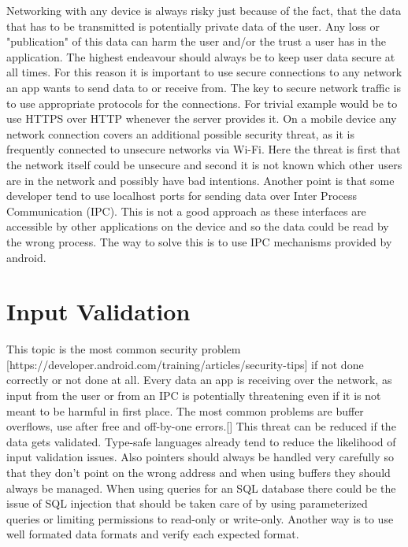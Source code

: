 Networking with any device is always risky just because of the fact, that the data that has to be transmitted is potentially private data of the user. Any loss or "publication" of this data can harm the user and/or the trust a user has in the application. The highest endeavour should always be to keep user data secure at all times. For this reason it is important to use secure connections to any network an app wants to send data to or receive from. 
The key to secure network traffic is to use appropriate protocols for the connections. For trivial example would be to use HTTPS over HTTP whenever the server provides it.
On a mobile device any network connection covers an additional possible security threat, as it is frequently connected to unsecure networks via Wi-Fi. Here the threat is first that the network itself could be unsecure and second it is not known which other users are in the network and possibly have bad intentions.
Another point is that some developer tend to use localhost ports for sending data over Inter Process Communication (IPC). This is not a good approach as these interfaces are accessible by other applications on the device and so the data could be read by the wrong process. The way to solve this is to use IPC mechanisms provided by android.

\section{Input Validation}
\label{chp:howto:sec:inputValidation}

This topic is the most common security problem [https://developer.android.com/training/articles/security-tips] if not done correctly or not done at all. Every data an app is receiving over the network, as input from the user or from an IPC is potentially threatening even if it is not meant to be harmful in first place.
The most common problems are buffer overflows, use after free and off-by-one errors.[] This threat can be reduced if the data gets validated.
Type-safe languages already tend to reduce the likelihood of input validation issues. Also pointers should always be handled very carefully so that they don't point on the wrong address and when using buffers they should always be managed.
When using queries for an SQL database there could be the issue of SQL injection that should be taken care of by using parameterized queries or limiting permissions to read-only or write-only. Another way is to use well formated data formats and verify each expected format.
